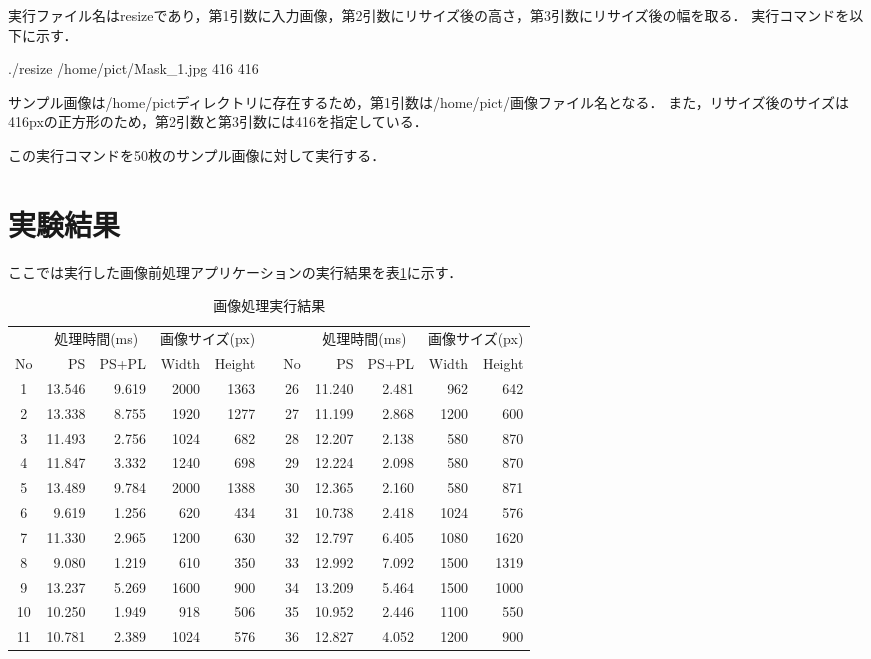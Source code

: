 \documentclass[11pt,a4j]{jreport}
\begin{document}
実行ファイル名はresizeであり，第1引数に入力画像，第2引数にリサイズ後の高さ，第3引数にリサイズ後の幅を取る．
実行コマンドを以下に示す．

./resize /home/pict/Mask_1.jpg 416 416

サンプル画像は/home/pictディレクトリに存在するため，第1引数は/home/pict/画像ファイル名となる．
また，リサイズ後のサイズは416pxの正方形のため，第2引数と第3引数には416を指定している．

この実行コマンドを50枚のサンプル画像に対して実行する．

\clearpage
\section{実験結果}
ここでは実行した画像前処理アプリケーションの実行結果を表\ref{result}に示す．
\begin{table}[H]
  \caption{画像処理実行結果}
  \label{result}
  \begin{tabular}{|c|r|r|r|r|c|c|r|r|r|r|}
    \cline{1-5} \cline{7-11}
    & \multicolumn{2}{c|}{処理時間(ms)} & \multicolumn{2}{c|}{画像サイズ(px)} && & \multicolumn{2}{c|}{処理時間(ms)} & \multicolumn{2}{c|}{画像サイズ(px)} \\
    \cline{1-5} \cline{7-11}
    No & PS & PS+PL & Width & Height & & No & PS & PS+PL & Width & Height \\
    \cline{1-5} \cline{7-11}
    1 & 13.546 & 9.619 & 2000 & 1363 && 26 & 11.240 & 2.481 & 962 & 642 \\
    2 & 13.338 & 8.755 & 1920 & 1277 && 27 & 11.199 & 2.868 & 1200 & 600 \\
    3 & 11.493 & 2.756 & 1024 & 682 && 28 & 12.207 & 2.138 & 580 & 870 \\
    4 & 11.847 & 3.332 & 1240 & 698 && 29 & 12.224 & 2.098 & 580 & 870 \\
    5 & 13.489 & 9.784 & 2000 & 1388 && 30 & 12.365 & 2.160 & 580 & 871 \\
    6 & 9.619 & 1.256 & 620 & 434 && 31 & 10.738 & 2.418 & 1024 & 576 \\
    7 & 11.330 & 2.965 & 1200 & 630 && 32 & 12.797 & 6.405 & 1080 & 1620 \\
    8 & 9.080 & 1.219 & 610 & 350 && 33 & 12.992 & 7.092 & 1500 & 1319 \\
    9 & 13.237 & 5.269 & 1600 & 900 && 34 & 13.209 & 5.464 & 1500 & 1000 \\
    10 & 10.250 & 1.949 & 918 & 506 && 35 & 10.952 & 2.446 & 1100 & 550 \\
    11 & 10.781 & 2.389 & 1024 & 576 && 36 & 12.827 & 4.052 & 1200 & 900 \\

\end{tabular}
\end{table}
\end{document}
